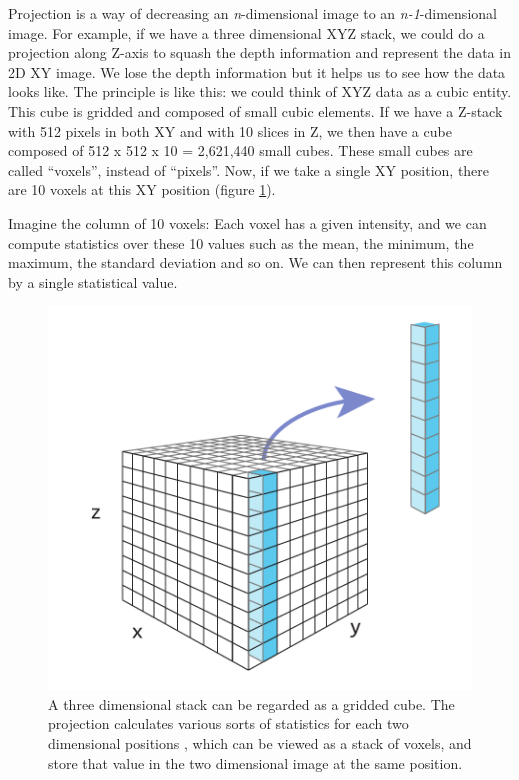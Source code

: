 Projection is a way of decreasing an \textit{n}-dimensional image to an \textit{n-1}-dimensional image. For example, if we have a three dimensional XYZ stack, we could do a projection along Z-axis to squash the depth information and represent the data in 2D XY image. We lose the depth information but it helps us to see how the data looks like. The principle is like this: we could think of XYZ data as a cubic entity. This cube is gridded and composed of small cubic elements. If we have a Z-stack  with 512 pixels in both XY and with 10 slices in Z, we then have a 
cube composed of 512 x 512 x 10 =  2,621,440 small cubes. These small cubes are called ``voxels'', instead of ``pixels''. Now, if we take a single XY position, there are 10 voxels at this XY position (figure \ref{fig:projectionscheme}).
 
Imagine the column of 10 voxels: Each voxel has a given intensity, and we can compute statistics over these 10 values such as the mean, the minimum, the maximum, the standard deviation and so on. We can then represent this column by a single statistical value.  

\begin{figure}[h!]
\begin{center}
\includegraphics[scale=0.8]{fig/projection.pdf}
\caption{A three dimensional stack can be regarded as a gridded cube. The projection calculates various sorts of statistics for each two dimensional positions , which can be viewed as a stack of voxels, and store that value in the two dimensional image at the same position.}
\label{fig:projectionscheme}
\end{center}
\end{figure}

